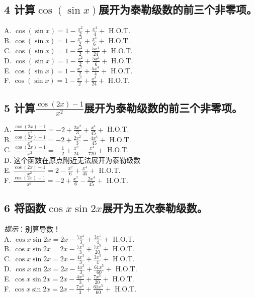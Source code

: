 \documentclass[a5paper, 11pt]{article}
\begin{document}
\subsection*{4 \K 计算$\cos(\sin x)$展开为泰勒级数的前三个非零项。}
A. $\cos(\sin x) = 1 - \frac{x^2}{2} + \frac{x^4}{4} +$ H.O.T. \\
B. $\cos(\sin x) = 1 - \frac{x^2}{2} + \frac{x^4}{6} +$ H.O.T. \\
C. $\cos(\sin x) = 1 - \frac{x^2}{2} + \frac{5x^4}{24} +$ H.O.T. \\
D. $\cos(\sin x) = 1 - \frac{x^2}{2} + \frac{5x^4}{6} +$ H.O.T. \\
E. $\cos(\sin x) = 1 - \frac{x^2}{2} + \frac{5x^4}{4} +$ H.O.T. \\
F. $\cos(\sin x) = 1 - \frac{x^2}{2} + \frac{x^4}{24} +$ H.O.T. \\

\subsection*{5 \K 计算$\frac{\cos(2x)-1}{x^2}$展开为泰勒级数的前三个非零项。}
A. $\frac{\cos(2x) - 1}{x^2} = -2 + \frac{2x^2}{3} +\frac{x^4}{45} +$ H.O.T. \\
B. $\frac{\cos(2x) - 1}{x^2} = -2 + \frac{2x^2}{3} - \frac{4x^4}{45} +$ H.O.T. \\
C. $\frac{\cos(2x) - 1}{x^2} = -\frac{1}{2} + \frac{x^2}{24} - \frac{x^4}{720} +$ H.O.T. \\
D. 这个函数在原点附近无法展开为泰勒级数 \\
E. $\frac{\cos(2x) - 1}{x^2} = 2 - \frac{x^2}{6} + \frac{x^4}{45} +$ H.O.T. \\
F. $\frac{\cos(2x) - 1}{x^2} = -2 + \frac{x^2}{6} - \frac{2x^4}{45} +$ H.O.T. \\

\subsection*{6 \K 将函数$\cos x \sin 2x$展开为五次泰勒级数。}
\emph{提示}：别算导数！\\
A. $\cos x \sin 2x = 2x - \frac{7x^3}{3} + \frac{3x^5}{4} +$ H.O.T. \\
B. $\cos x \sin 2x = 2x - \frac{7x^3}{3} + \frac{7x^5}{20} +$ H.O.T. \\
C. $\cos x \sin 2x = 2x - \frac{4x^3}{3} + \frac{3x^5}{4} +$ H.O.T. \\
D. $\cos x \sin 2x = 2x - \frac{4x^3}{3} + \frac{61x^5}{60} +$ H.O.T. \\
E. $\cos x \sin 2x = 2x - \frac{4x^3}{3} + \frac{7x^5}{20} +$ H.O.T. \\
F. $\cos x \sin 2x = 2x - \frac{7x^3}{3} + \frac{61x^5}{60} +$ H.O.T. \\
\end{document}
